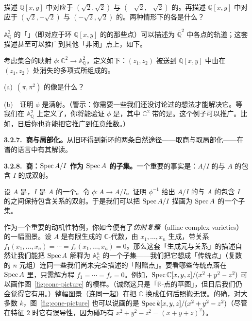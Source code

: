 \begin{exercise}\label{ex:maximal-ideals-sqrt2}
描述 $\mathbb{Q}[x,y]$ 中对应于 $(\sqrt{2},\sqrt{2})$ 与 $(-\sqrt{2},-\sqrt{2})$ 的\trMaximalIdeal。再描述 $\mathbb{Q}[x,y]$ 中对应于 $(\sqrt{2},-\sqrt{2})$ 与 $(-\sqrt{2},\sqrt{2})$ 的\trMaximalIdeal。两种情形下的\trResidueField{}各是什么？
\end{exercise}

$\mathbb{A}^2_{\mathbb{Q}}$ 的「\trClosedPoint」（即对应于环 $\mathbb{Q}[x,y]$ 的\trMaximalIdeal{}的那些点）可以描述为 $\overline{\mathbb{Q}}^2$ 中各点的\trGalois{}轨道；这套描述甚至可以推广到其他「非闭」点上，如下。

\begin{exercise}[不重要但棘手而有趣的练习]\label{ex:map-c2-a2q}
考虑集合的映射 $\phi\colon\mathbb{C}^2\to\mathbb{A}^2_{\mathbb{Q}}$，定义如下：$(z_1,z_2)$ 被送到 $\mathbb{Q}[x,y]$ 中由在 $(z_1,z_2)$ 处消失的多项式所组成的\trPrimeIdeal。

(a)~$(\pi,\pi^2)$ 的像是什么？

(b)~\hard\ 证明 $\phi$ 是满射。（警示：你需要一些我们还没讨论过的想法才能解决它。等我们在 $\mathbb{A}^2_{\mathbb{Q}}$ 上定义了\trZariskiTopology，你将能验证 $\phi$ 是\trContinuousMap，其中 $\mathbb{C}^2$ 带的是\trClassicalTopology。这个例子可以推广。比如，日后你也许能把它推广到任意维数。）
\end{exercise}

\textbf{3.2.7.\ 商与局部化。}\quad 从旧环得到新环的两条自然途径——取商与取局部化——在谱的语言中有其解读。

\textbf{3.2.8.\ 商：$\operatorname{Spec} A/I$ 作为 $\operatorname{Spec} A$ 的子集。}\quad 一个重要的事实是：$A/I$ 的\trPrimeIdeal{}与 $A$ 的包含 $I$ 的\trPrimeIdeal{}成双射。

\begin{exercise}\label{ex:quotient-primes-bijection}
设 $A$ 是\trRing，$I$ 是 $A$ 的一个\trIdeal。令 $\phi\colon A\to A/I$。证明 $\phi^{-1}$ 给出 $A/I$ 的\trPrimeIdeal{}与 $A$ 的包含 $I$ 的\trPrimeIdeal{}之间保持包含关系的双射。于是我们可以把 $\operatorname{Spec} A/I$ 描画为 $\operatorname{Spec} A$ 的一个子集。
\end{exercise}

作为一个重要的动机性特例，你如今便有了\emph{仿射复簇}（affine complex varieties）的一幅图景。设 $A$ 是有限生成的 $\mathbb{C}$-代数，由 $x_1,\dots,x_n$ 生成，带关系 $f_1(x_1,\dots,x_n)=\cdots=f_r(x_1,\dots,x_n)=0$。那么这套「生成元与关系」的描述自然让我们能把 $\operatorname{Spec} A$ 解释为 $\mathbb{A}^n_{\mathbb{C}}$ 的一个子集——我们把它想成「传统点」（复数的 $n$ 元组）连同一些我们尚未完全描述的「附赠点」。要看哪些传统点落在 $\operatorname{Spec} A$ 里，只需解方程 $f_1=\cdots=f_r=0$。例如，$\operatorname{Spec}\mathbb{C}[x,y,z]/(x^2+y^2-z^2)$ 可以画作图~\ref{fig:cone-picture} 的模样。（诚然这只是「$\mathbb{R}$-点的草图」，但日后我们仍会觉得它有用。）整幅图景（连同\trNullstellensatz{}一起）在把 $\mathbb{C}$ 换成任何\trAlgClosedField{}后照搬无误。的确，对大多数\trAlgClosedField{} $k$，图~\ref{fig:cone-picture} 也可以说画的是 $\operatorname{Spec} k[x,y,z]/(x^2+y^2-z^2)$（尽管在特征 $2$ 时它有误导性，因为碰巧有 $x^2+y^2-z^2=(x+y+z)^2$）。

